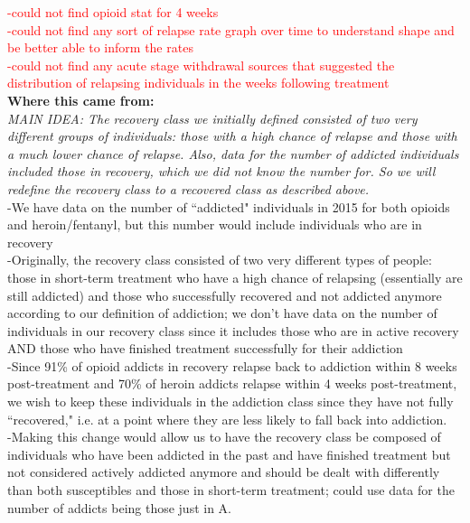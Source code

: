 \documentclass[12pt]{article}
\begin{document}
\textcolor{red}{-could not find opioid stat for 4 weeks \\
-could not find any sort of relapse rate graph over time to understand shape and be better able to inform the rates \\
-could not find any acute stage withdrawal sources that suggested the distribution of relapsing individuals in the weeks following treatment}  \\



\textbf{Where this came from:} \\

\textit{MAIN IDEA: The recovery class we initially defined consisted of two very different groups of individuals: those with a high chance of relapse and those with a much lower chance of relapse. Also, data for the number of addicted individuals included those in recovery, which we did not know the number for. So we will redefine the recovery class to a recovered class as described above.} \\

-We have data on the number of ``addicted" individuals in 2015 for both opioids and heroin/fentanyl, but  this number would include individuals who are in recovery \\
-Originally, the recovery class consisted of two very different types of people: those in short-term treatment who have a high chance of relapsing (essentially are still addicted) and those who successfully recovered and not addicted anymore according to our definition of addiction; we don't have data on the number of individuals in our recovery class since it includes those who are in active recovery AND those who have finished treatment successfully for their addiction \\
-Since 91\% of opioid addicts in recovery relapse back to addiction within 8 weeks post-treatment and 70\% of heroin addicts relapse within 4 weeks post-treatment, we wish to keep these individuals in the addiction class since they have not fully ``recovered," i.e. at a point where they are less likely to fall back into addiction. \cite{Weiss, Smyth}\\
-Making this change would allow us to have the recovery class be composed of individuals who have been addicted in the past and have finished treatment but not considered actively addicted anymore and should be dealt with differently than both susceptibles and those in short-term treatment; could use data for the number of addicts being those just in A. \\ 
\end{document}
